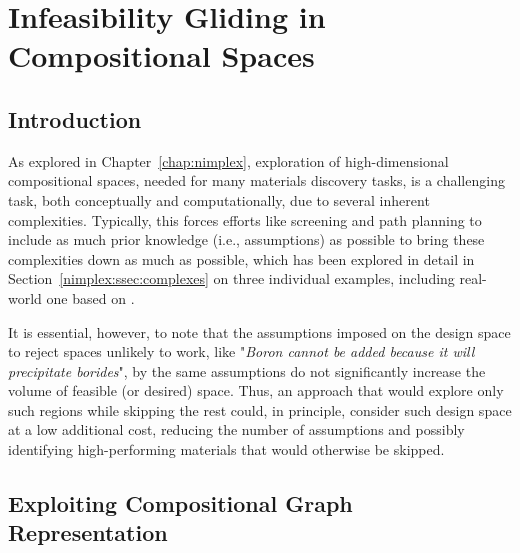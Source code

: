 \chapter{Infeasibility Gliding in Compositional Spaces} \label{chap:infeasibilitygliding}


\section{Introduction} \label{infglide:sec:intro}

As explored in Chapter~\ref{chap:nimplex}, exploration of high-dimensional compositional spaces, needed for many materials discovery tasks, is a challenging task, both conceptually and computationally, due to several inherent complexities. Typically, this forces efforts like screening and path planning to include as much prior knowledge (i.e., assumptions) as possible to bring these complexities down as much as possible, which has been explored in detail in Section~\ref{nimplex:ssec:complexes} on three individual examples, including real-world one based on \citet{Bobbio2022DesignCompositions}.

It is essential, however, to note that the assumptions imposed on the design space to reject spaces unlikely to work, like "\textit{Boron cannot be added because it will precipitate borides}", by the same assumptions do not significantly increase the volume of feasible (or desired) space. Thus, an approach that would explore only such regions while skipping the rest could, in principle, consider such design space at a low additional cost, reducing the number of assumptions and possibly identifying high-performing materials that would otherwise be skipped.

\section{Exploiting Compositional Graph Representation} \label{infglide:sec:exploitgraph}

